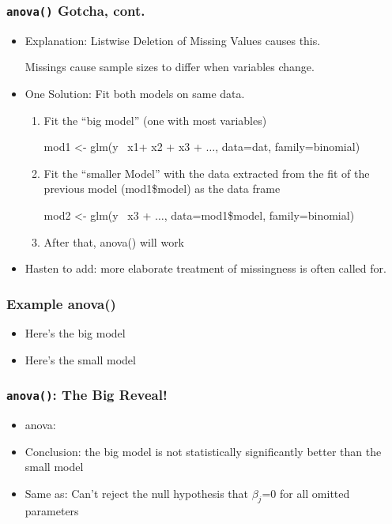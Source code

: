 \documentclass[10pt,english]{beamer}
\begin{document}
\begin{frame}
  \frametitle{\texttt{anova()} Gotcha, cont.}
  \begin{itemize}
    \item Explanation: Listwise Deletion of Missing Values causes this.

      Missings cause sample sizes to differ when variables change.

    \item One Solution: Fit both models on same data.
    \begin{enumerate}
      \item Fit the ``big model'' (one with most variables)


mod1 <- glm(y~ x1+ x2 + x3 + $\ldots$, data=dat, family=binomial)


      \item Fit the ``smaller Model'' with the data extracted from
        the fit of the previous model (mod1\$model) as the data frame

mod2 <- glm(y~  x3 + $\ldots$, data=mod1\$model, family=binomial)

     \item After that, anova() will work

     \end{enumerate}

     \item Hasten to add: more elaborate treatment of missingness is
       often called for.

   \end{itemize}
\end{frame}

\begin{frame}[containsverbatim]
  \frametitle{Example anova()}
  \begin{itemize}


  \item Here's the big model


 \item Here's the small model


 \end{itemize}
 \end{frame}




\begin{frame}[containsverbatim]
  \frametitle{\texttt{anova()}: The Big Reveal!}
  \begin{itemize}

  \item anova:


  \item Conclusion: the big model is not statistically significantly
    better than the small model
  \item Same as: Can't reject the null hypothesis that $\beta_j$=0 for
    all omitted parameters
 \end{itemize}
\end{frame}
\end{document}
